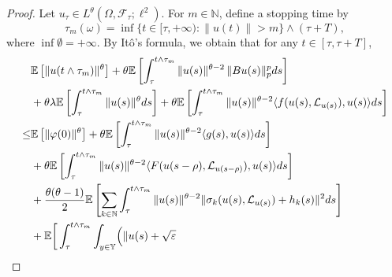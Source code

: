 \documentclass[11pt]{article}
\numberwithin{equation}{section}
\theoremstyle{plain}
\begin{document}
\begin{proof}
Let 
 $u_\tau\in L^\theta(\Omega,\mathcal{F}_\tau;\ell^2)$. 
 For $m\in\mathbb N$, define a stopping time by
 \[ 
     \tau_m(\omega)
     = \inf\{t \in [\tau, +\infty) : \|u(t)\| > m \}\wedge(\tau+T),
 \]
 where $\inf \emptyset = +\infty$.  
 By Itô's formula, we obtain that for any $t \in [\tau, \tau+T]$,
\begin{align}\label{theta1}
	  & \mathbb{E} \left[ \| u(t \wedge \tau_m) \|^{\theta} \right]
	      + \theta
	             \mathbb{E}
	                    \left[ \int_{\tau}^{t \wedge \tau_m}
	                                      \| u(s) \|^{\theta-2} \, \| B u(s) \|_p^{p} ds
          	           \right]  \nonumber\\
	  & + \theta \lambda 
	             \mathbb{E}
	                   \left[ \int_{\tau}^{t \wedge \tau_m}
	                                     \| u(s) \|^{\theta} ds
	                   \right]  
	      + \theta
             	\mathbb{E}
             	       \left[ \int_{\tau}^{t \wedge \tau_m}
	                                     \| u(s) \|^{\theta-2}
	                                     \langle f(u(s), \mathcal{L}_{u(s)}), u(s) \rangle ds
	                  \right]  \nonumber\\
 \le & \mathbb{E}\left[ \| \varphi(0) \|^{\theta} \right] 
       + \theta
	           \mathbb{E}
	                 \left[ \int_{\tau}^{t \wedge \tau_m}
        	                           \| u(s) \|^{\theta-2}
	                                  \langle g(s), u(s) \rangle ds
	                \right]  \nonumber\\
	  & + \theta
	            \mathbb{E}
	                   \left[ \int_{\tau}^{t \wedge \tau_m}
	                                     \| u(s) \|^{\theta-2}
	                                     \langle F(u(s-\rho), \mathcal{L}_{u(s-\rho)}), u(s) \rangle ds
	                  \right]  \nonumber\\
	  & + \frac{\theta (\theta-1) }{2}
	             \mathbb{E}
	                   \left[ \sum_{k \in \mathbb{N} } 
	                                   \int_{\tau}^{t \wedge \tau_m}
	                                            \| u(s) \|^{\theta-2}
	                                            \| \sigma_k(u(s), \mathcal{L}_{u(s)}) + h_k(s) \|^{2} ds
	                   \right]  \nonumber\\
	  & + \mathbb{E}
	                \bigg[ \int_{\tau}^{t \wedge \tau_m}
	                             \int_{y \in \mathbb{Y} }
	                                 \Bigl( \| u(s) 
	                                             + \sqrt{\varepsilon}

\end{align}
\end{proof}
\end{document}

